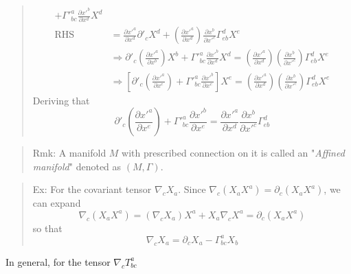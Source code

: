 \begin{quote}
\begin{equation}
\begin{aligned}
+ \Gamma'^{a}_{bc} \frac{\partial x'^{b}}{\partial x^{d}}X^{d}\\
\mathrm{RHS}
&= \frac{\partial x'^{a}}{\partial x^{d}}\partial'_{c}X^{d}
+ \left(\frac{\partial x'^{a}}{\partial x^{d}}\right) \frac{\partial x^{b}}{\partial x'^{c}}\Gamma^{d}_{eb}X^{e}\\
&\Rightarrow
\partial'_{c}\left(\frac{\partial x'^{a}}{\partial x^{b}}\right) X^{b}
+
\Gamma'^{a}_{bc} \frac{\partial x'^{b}}{\partial x^{d}}X^{d}
=
\left(\frac{\partial x'^{a}}{\partial x^{d}}\right) \left(\frac{\partial x^{b}}{\partial x'^{c}}\right)\Gamma^{d}_{eb}X^{e} \\
&\Rightarrow
\left[
\partial'_{c}\left(\frac{\partial x'^{a}}{\partial x^{e}}\right)
+
\Gamma'^{a}_{bc} \frac{\partial x'^{b}}{\partial x^{e}}
\right]X^{e}
=
\left(\frac{\partial x'^{a}}{\partial x^{d}}\right) \left(\frac{\partial x^{b}}{\partial x'^{c}}\right)\Gamma^{d}_{eb}X^{e}
\end{aligned}
\end{equation}
Deriving that
\begin{equation}
\partial'_{c}\left(\frac{\partial x'^{a}}{\partial x^{e}}\right)
+
\Gamma'^{a}_{bc} \frac{\partial x'^{b}}{\partial x^{e}}
=
\frac{\partial x'^{a}}{\partial x^{d}} \frac{\partial x^{b}}{\partial x'^{c}}\Gamma^{d}_{eb}
\end{equation}

\end{quote}
\begin{quote}
	Rmk:
A manifold $M$ with prescribed connection on it is called an "\textit{Affined manifold}" denoted as $(M,\Gamma)$.
\end{quote}

\begin{quote}
	Ex: For the covariant tensor $\nabla_{c} X_{a}$.
Since $\nabla_{c}(X_{a}X^{a}) = \partial_{c}(X_{a}X^{a})$, we can expand
\begin{equation}
\nabla_{c}\left(X_{a}X^{a}\right) = \left(\nabla_{c}X_{a}\right)X^{a} + X_{a}\nabla_{c}X^{a} = \partial_{c}(X_{a}X^{a})
\end{equation}
so that
\begin{equation}
\nabla_{c}X_{a} = \partial_{c} X_{a} - \Gamma^{a}_{bc} X_{b}
\end{equation}

\end{quote}
In general, for the tensor $\nabla_{c}T^{a}_{bc}$


